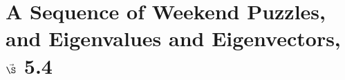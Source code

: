


%
%
%

\section{{A Sequence of Weekend Puzzles,} and
{Eigenvalues and Eigenvectors, $\vec\S$ 5.4}}%



%
\thispagestyle{fancy}

